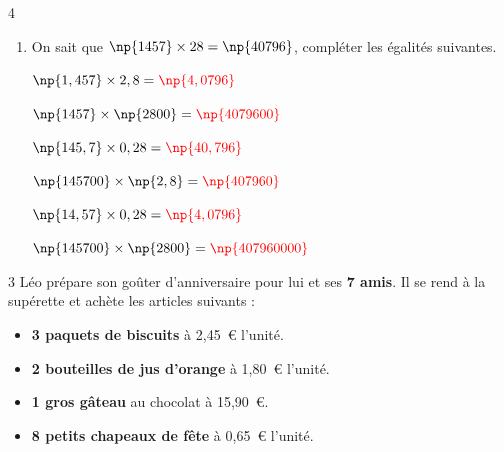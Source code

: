 \documentclass[a4paper]{book}
\begin{document}
{\begin{exerciceNote}{4}
\begin{enumerate}
            \item On sait que $\np{1457}\times28=\np{40796}$, compléter les égalités suivantes.

            \medskip
        
            \begin{minipage}{0.33\linewidth}
                $\np{1,457}\times2,8=\textcolor{red}{\np{4,0796}}$
                
                \bigskip
                
                 $\np{1457}\times\np{2800}=\textcolor{red}{\np{4079600}}$
            \end{minipage}
            \hfill\vline\hfill
            \begin{minipage}{0.33\linewidth}
                \quad $\np{145,7}\times0,28=\textcolor{red}{\np{40,796}}$
                
                \bigskip
                
                 \quad $\np{145700}\times\np{2,8}=\textcolor{red}{\np{407960}}$
            \end{minipage}        
            \hfill\vline\hfill
            \begin{minipage}{0.33\linewidth}
                \quad $\np{14,57}\times0,28=\textcolor{red}{\np{4,0796}}$
                
                \bigskip
                
                \quad $\np{145700}\times\np{2800}=\textcolor{red}{\np{407960000}}$
            \end{minipage}
        \end{enumerate}
    \end{exerciceNote}
    

    \begin{exerciceNote}{3}
        Léo prépare son goûter d'anniversaire pour lui et ses \textbf{7 amis}. Il se rend à la supérette et achète les articles suivants :
        
        \begin{itemize}
            \item \textbf{3 paquets de biscuits} à 2,45~\euro{} l'unité.
            \item \textbf{2 bouteilles de jus d'orange} à 1,80~\euro{} l'unité.
            \item \textbf{1 gros gâteau} au chocolat à 15,90~\euro{}.
            \item \textbf{8 petits chapeaux de fête} à 0,65~\euro{} l'unité.
        \end{itemize}
        

\end{exerciceNote}}
\end{document}
